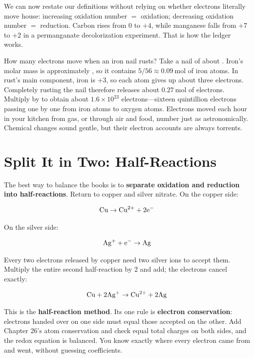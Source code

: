 We can now restate our definitions without relying on whether electrons literally move house: increasing oxidation number $=$ oxidation; decreasing oxidation number $=$ reduction. Carbon rises from 0 to $+4$, while manganese falls from $+7$ to $+2$ in a permanganate decolorization experiment. That is how the ledger works.

\begin{qiaoliang}
How many electrons move when an iron nail rusts? Take a nail of about . Iron's molar mass is approximately , so it contains $5/56 \approx 0.09\ \mathrm{mol}$ of iron atoms. In rust's main component, iron is $+3$, so each atom gives up about three electrons. Completely rusting the nail therefore releases about $0.27\ \mathrm{mol}$ of electrons. Multiply by  to obtain about $1.6\times 10^{23}$ electrons---sixteen quintillion electrons passing one by one from iron atoms to oxygen atoms. Electrons moved each hour in your kitchen from gas, or through air and food, number just as astronomically. Chemical changes sound gentle, but their electron accounts are always torrents.
\end{qiaoliang}

\section{Split It in Two: Half-Reactions}

The best way to balance the books is to \textbf{separate oxidation and reduction into half-reactions}. Return to copper and silver nitrate. On the copper side:

\[\mathrm{Cu} \rightarrow \mathrm{Cu^{2+}} + \mathrm{2e^-}\]

On the silver side:

\[\mathrm{Ag^+} + \mathrm{e^-} \rightarrow \mathrm{Ag}\]

Every two electrons released by copper need two silver ions to accept them. Multiply the entire second half-reaction by 2 and add; the electrons cancel exactly:

\[\mathrm{Cu} + \mathrm{2Ag^+} \rightarrow \mathrm{Cu^{2+}} + \mathrm{2Ag}\]

This is the \textbf{half-reaction method}. Its one rule is \textbf{electron conservation}: electrons handed over on one side must equal those accepted on the other. Add Chapter 26's atom conservation and check equal total charges on both sides, and the redox equation is balanced. You know exactly where every electron came from and went, without guessing coefficients.

